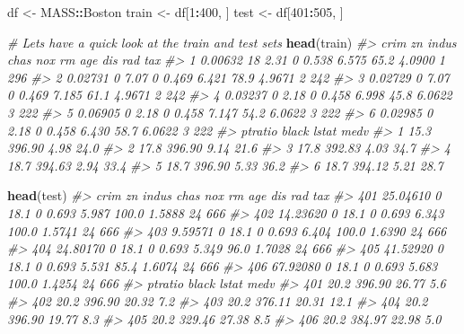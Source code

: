 \documentclass[
]{book}
\newenvironment{Shaded}{\begin{snugshade}}{\end{snugshade}}
\newcommand{\CommentTok}[1]{\textcolor[rgb]{0.56,0.35,0.01}{\textit{#1}}}
\newcommand{\DecValTok}[1]{\textcolor[rgb]{0.00,0.00,0.81}{#1}}
\newcommand{\FunctionTok}[1]{\textcolor[rgb]{0.13,0.29,0.53}{\textbf{#1}}}
\newcommand{\NormalTok}[1]{#1}
\newcommand{\OtherTok}[1]{\textcolor[rgb]{0.56,0.35,0.01}{#1}}
\newcommand{\SpecialCharTok}[1]{\textcolor[rgb]{0.81,0.36,0.00}{\textbf{#1}}}
\begin{document}
\begin{Shaded}
\begin{Highlighting}[]
\NormalTok{df }\OtherTok{\textless{}{-}}\NormalTok{ MASS}\SpecialCharTok{::}\NormalTok{Boston}
\NormalTok{train }\OtherTok{\textless{}{-}}\NormalTok{ df[}\DecValTok{1}\SpecialCharTok{:}\DecValTok{400}\NormalTok{, ]}
\NormalTok{test }\OtherTok{\textless{}{-}}\NormalTok{ df[}\DecValTok{401}\SpecialCharTok{:}\DecValTok{505}\NormalTok{, ]}

\CommentTok{\# Let\textquotesingle{}s have a quick look at the train and test sets}
\FunctionTok{head}\NormalTok{(train)}
\CommentTok{\#\textgreater{}      crim zn indus chas   nox    rm  age    dis rad tax}
\CommentTok{\#\textgreater{} 1 0.00632 18  2.31    0 0.538 6.575 65.2 4.0900   1 296}
\CommentTok{\#\textgreater{} 2 0.02731  0  7.07    0 0.469 6.421 78.9 4.9671   2 242}
\CommentTok{\#\textgreater{} 3 0.02729  0  7.07    0 0.469 7.185 61.1 4.9671   2 242}
\CommentTok{\#\textgreater{} 4 0.03237  0  2.18    0 0.458 6.998 45.8 6.0622   3 222}
\CommentTok{\#\textgreater{} 5 0.06905  0  2.18    0 0.458 7.147 54.2 6.0622   3 222}
\CommentTok{\#\textgreater{} 6 0.02985  0  2.18    0 0.458 6.430 58.7 6.0622   3 222}
\CommentTok{\#\textgreater{}   ptratio  black lstat medv}
\CommentTok{\#\textgreater{} 1    15.3 396.90  4.98 24.0}
\CommentTok{\#\textgreater{} 2    17.8 396.90  9.14 21.6}
\CommentTok{\#\textgreater{} 3    17.8 392.83  4.03 34.7}
\CommentTok{\#\textgreater{} 4    18.7 394.63  2.94 33.4}
\CommentTok{\#\textgreater{} 5    18.7 396.90  5.33 36.2}
\CommentTok{\#\textgreater{} 6    18.7 394.12  5.21 28.7}
\end{Highlighting}
\end{Shaded}

\begin{Shaded}
\begin{Highlighting}[]
\FunctionTok{head}\NormalTok{(test)}
\CommentTok{\#\textgreater{}         crim zn indus chas   nox    rm   age    dis rad tax}
\CommentTok{\#\textgreater{} 401 25.04610  0  18.1    0 0.693 5.987 100.0 1.5888  24 666}
\CommentTok{\#\textgreater{} 402 14.23620  0  18.1    0 0.693 6.343 100.0 1.5741  24 666}
\CommentTok{\#\textgreater{} 403  9.59571  0  18.1    0 0.693 6.404 100.0 1.6390  24 666}
\CommentTok{\#\textgreater{} 404 24.80170  0  18.1    0 0.693 5.349  96.0 1.7028  24 666}
\CommentTok{\#\textgreater{} 405 41.52920  0  18.1    0 0.693 5.531  85.4 1.6074  24 666}
\CommentTok{\#\textgreater{} 406 67.92080  0  18.1    0 0.693 5.683 100.0 1.4254  24 666}
\CommentTok{\#\textgreater{}     ptratio  black lstat medv}
\CommentTok{\#\textgreater{} 401    20.2 396.90 26.77  5.6}
\CommentTok{\#\textgreater{} 402    20.2 396.90 20.32  7.2}
\CommentTok{\#\textgreater{} 403    20.2 376.11 20.31 12.1}
\CommentTok{\#\textgreater{} 404    20.2 396.90 19.77  8.3}
\CommentTok{\#\textgreater{} 405    20.2 329.46 27.38  8.5}
\CommentTok{\#\textgreater{} 406    20.2 384.97 22.98  5.0}
\end{Highlighting}
\end{Shaded}
\end{document}

